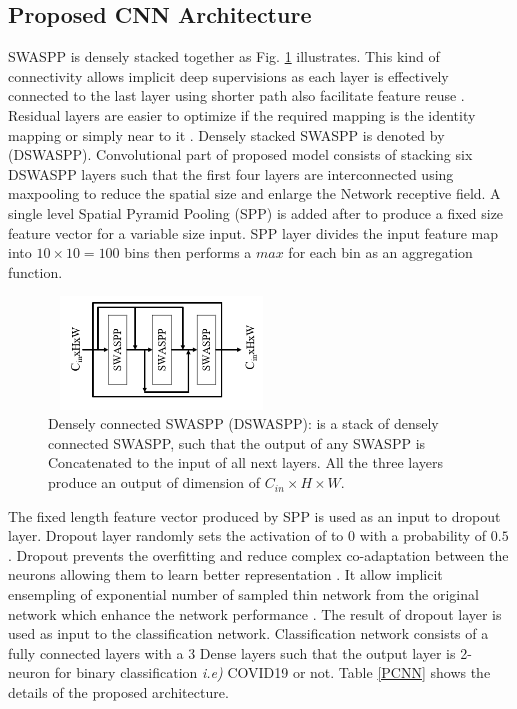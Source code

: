 \subsection{Proposed CNN Architecture}
SWASPP is densely stacked \cite{huang2017densely} together as Fig. \ref{denseB} illustrates. This kind of connectivity allows implicit deep supervisions as each layer is effectively connected to the last layer using shorter path also facilitate feature reuse \cite{huang2017densely}. Residual layers are easier to optimize if the required mapping is the identity mapping or simply near to it \cite{he2016deep}. Densely stacked SWASPP is denoted by (DSWASPP). Convolutional part of proposed model consists of stacking six DSWASPP layers such that the first four layers are interconnected using maxpooling to reduce the spatial size and enlarge the Network receptive field. A single level Spatial Pyramid Pooling (SPP) \cite{he2015spatial} is added after to produce a fixed size feature vector for a variable size input. SPP layer divides the input feature map into $10\times 10 = 100$ bins then performs a $max$ for each bin as an aggregation function. 
\begin{center}
\begin{figure}[htbp]
\centerline{\includegraphics[height=30mm,width=6cm]{Figures/DensResd.PNG}}
\caption{Densely connected SWASPP (DSWASPP): is a stack of densely connected SWASPP, such that the output of any SWASPP is Concatenated to the input of all next layers. All the three layers produce an output of dimension of $C_{in} \times H \times W$.}
\label{denseB}
\end{figure}
\end{center}
The fixed length feature vector produced by SPP is used as an input to dropout \cite{srivastava2014dropout} layer. Dropout layer randomly sets the activation of to $0$ with a probability of $0.5$. Dropout prevents the overfitting and reduce complex co-adaptation between the neurons allowing them to learn better representation \cite{srivastava2014dropout}. It allow implicit ensempling of exponential number of sampled thin network from the original network which enhance the network performance \cite{srivastava2014dropout}. The result of dropout layer is used as input to the classification network. Classification network consists of a fully connected layers with a $3$ Dense layers such that the output layer is 2-neuron for binary classification \textit{i.e)} COVID19 or not. Table \ref{PCNN} shows the details of the proposed architecture.

